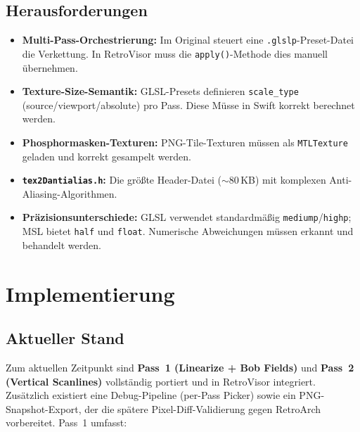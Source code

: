 \documentclass[11pt, a4paper]{article}
\begin{document}
\newpage \vspace*{-.25cm}
\subsection{Herausforderungen}
\vspace{.75cm}
\begin{itemize}[leftmargin=*, nosep]
    \item \textbf{Multi-Pass-Orchestrierung:} Im Original steuert eine \texttt{.glslp}-Preset-Datei die Verkettung. In RetroVisor muss die \texttt{apply()}-Methode dies manuell \"ubernehmen. \\
    \item \textbf{Texture-Size-Semantik:} GLSL-Presets definieren \texttt{scale\_type} (source/viewport/absolute) pro Pass. Diese M\"usse in Swift korrekt berechnet werden. \\
    \item \textbf{Phosphormasken-Texturen:} PNG-Tile-Texturen m\"ussen als \texttt{MTLTexture} geladen \newline und korrekt gesampelt werden. \\
    \item \textbf{\texttt{tex2Dantialias.h}:} Die gr\"o\ss te Header-Datei ($\sim$80\,KB) mit komplexen Anti-Aliasing-Algorithmen. \\
    \item \textbf{Pr\"azisionsunterschiede:} GLSL verwendet standardm\"a\ss ig \texttt{mediump}/\texttt{highp}; \newline MSL bietet \texttt{half} und \texttt{float}. Numerische Abweichungen m\"ussen erkannt \newline und behandelt werden.
\end{itemize}
\vspace{.75cm}
\section{Implementierung}
\vspace{.75cm}

\subsection{Aktueller Stand}
\vspace{.75cm}
Zum aktuellen Zeitpunkt sind \textbf{Pass~1 (Linearize + Bob Fields)} und \textbf{Pass~2 (Vertical Scanlines)} vollst\"andig portiert und in RetroVisor integriert. Zus\"atzlich existiert eine Debug-Pipeline (per-Pass Picker) sowie ein PNG-Snapshot-Export, der die sp\"atere Pixel-Diff-Validierung gegen RetroArch vorbereitet.
\vspace{.5cm} \newline Pass~1 umfasst: \vspace{.25cm}
\end{document}

